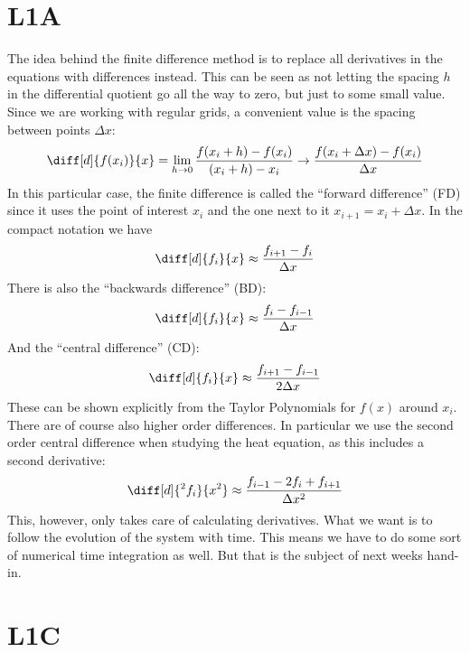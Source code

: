 \documentclass[sigconf]{acmart}
\begin{document}
\section{L1A}
The idea behind the finite difference method is to replace all derivatives in the equations with differences instead. This can be seen as not letting the spacing $ h $ in the differential quotient go all the way to zero, but just to some small value. Since we are working with regular grids, a convenient value is the spacing between points $ \Delta x $:
\begin{equation}\label{key}
	\diff[d]{f(x_i)}{x} = \lim\limits_{h\to 0} \frac{f(x_i + h) - f(x_i)}{(x_i+h) - x_i} \to \frac{f(x_i + \Delta x) - f(x_i)}{\Delta x}
\end{equation}
In this particular case, the finite difference is called the ``forward difference'' (FD) since it uses the point of interest $ x_i $ and the one next to it $ x_{i+1} = x_i + \Delta x $. In the compact notation we have
\begin{equation}\label{key}
	\diff[d]{f_i}{x} \approx \frac{f_{i+1} - f_{i}}{\Delta x}
\end{equation}
There is also the ``backwards difference'' (BD):
\begin{equation}\label{key}
	\diff[d]{f_i}{x} \approx \frac{f_{i} - f_{i-1}}{\Delta x}
\end{equation}
And the ``central difference'' (CD):
\begin{equation}\label{key}
	\diff[d]{f_i}{x} \approx \frac{f_{i+1} - f_{i-1}}{2 \Delta x}
\end{equation}
These can be shown explicitly from the Taylor Polynomials for $ f(x) $ around $ x_i $. There are of course also higher order differences. In particular we use the second order central difference when studying the heat equation, as this includes a second derivative:
\begin{equation}\label{key}
	\diff[d]{^2 f_i}{x^2} \approx \frac{f_{i-1} - 2f_i + f_{i+1}}{\Delta x^2}
\end{equation}
This, however, only takes care of calculating derivatives. What we want is to follow the evolution of the system with time. This means we have to do some sort of numerical time integration as well. But that is the subject of next weeks hand-in.

\section{L1C}
\end{document}
